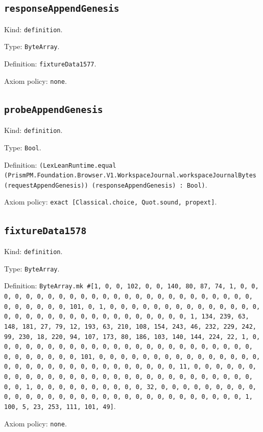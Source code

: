\documentclass[11pt]{article}
\begin{document}
\subsection*{\texttt{responseAppendGenesis}}
\noindent Kind: \texttt{definition}.\par
\noindent Type: \texttt{ByteArray}.\par
\noindent Definition: \texttt{fixtureData1577}.\par
\noindent Axiom policy: \texttt{none}.\par
\subsection*{\texttt{probeAppendGenesis}}
\noindent Kind: \texttt{definition}.\par
\noindent Type: \texttt{Bool}.\par
\noindent Definition: \texttt{(LexLeanRuntime.equal (PrismPM.Foundation.Browser.V1.WorkspaceJournal.workspaceJournalBytes (requestAppendGenesis)) (responseAppendGenesis) : Bool)}.\par
\noindent Axiom policy: \texttt{exact [Classical.choice, Quot.sound, propext]}.\par
\subsection*{\texttt{fixtureData1578}}
\noindent Kind: \texttt{definition}.\par
\noindent Type: \texttt{ByteArray}.\par
\noindent Definition: \texttt{ByteArray.mk \#[1, 0, 0, 102, 0, 0, 140, 80, 87, 74, 1, 0, 0, 0, 0, 0, 0, 0, 0, 0, 0, 0, 0, 0, 0, 0, 0, 0, 0, 0, 0, 0, 0, 0, 0, 0, 0, 0, 0, 0, 0, 0, 101, 0, 1, 0, 0, 0, 0, 0, 0, 0, 0, 0, 0, 0, 0, 0, 0, 0, 0, 0, 0, 0, 0, 0, 0, 0, 0, 0, 0, 0, 0, 0, 0, 0, 1, 134, 239, 63, 148, 181, 27, 79, 12, 193, 63, 210, 108, 154, 243, 46, 232, 229, 242, 99, 230, 18, 220, 94, 107, 173, 80, 186, 103, 140, 144, 224, 22, 1, 0, 0, 0, 0, 0, 0, 0, 0, 0, 0, 0, 0, 0, 0, 0, 0, 0, 0, 0, 0, 0, 0, 0, 0, 0, 0, 0, 0, 0, 0, 0, 101, 0, 0, 0, 0, 0, 0, 0, 0, 0, 0, 0, 0, 0, 0, 0, 0, 0, 0, 0, 0, 0, 0, 0, 0, 0, 0, 0, 0, 0, 0, 0, 11, 0, 0, 0, 0, 0, 0, 0, 0, 0, 0, 0, 0, 0, 0, 0, 0, 0, 0, 0, 0, 0, 0, 0, 0, 0, 0, 0, 0, 0, 0, 0, 1, 0, 0, 0, 0, 0, 0, 0, 0, 0, 0, 32, 0, 0, 0, 0, 0, 0, 0, 0, 0, 0, 0, 0, 0, 0, 0, 0, 0, 0, 0, 0, 0, 0, 0, 0, 0, 0, 0, 0, 0, 0, 0, 1, 100, 5, 23, 253, 111, 101, 49]}.\par
\noindent Axiom policy: \texttt{none}.\par
\end{document}
